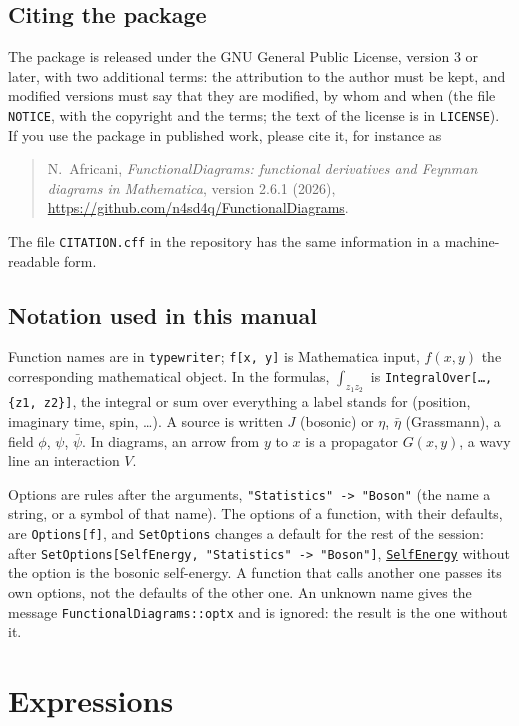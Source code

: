 \documentclass[11pt,a4paper]{article}
\newcommand{\pkg}[1]{\texttt{#1}}
\newcommand{\fnref}[1]{\hyperref[fn:#1]{\pkg{#1}}}
\begin{document}
\subsection{Citing the package}\label{sec:citing}

The package is released under the GNU General Public License, version 3 or later, with two additional terms: the
attribution to the author must be kept, and modified versions must say that they are modified, by whom and when (the
file \pkg{NOTICE}, with the copyright and the terms; the text of the license is in \pkg{LICENSE}). If you use the package
in published work, please cite it, for instance as
\begin{quote}
N.~Africani, \emph{FunctionalDiagrams: functional derivatives and Feynman diagrams in Mathematica}, version 2.6.1 (2026),
\url{https://github.com/n4sd4q/FunctionalDiagrams}.
\end{quote}
The file \pkg{CITATION.cff} in the repository has the same information in a machine-readable form.

\subsection{Notation used in this manual}\label{sec:notation}

Function names are in \pkg{typewriter}; \pkg{f[x, y]} is Mathematica input, $f(x,y)$ the corresponding mathematical
object. In the formulas, $\int_{z_1z_2}$ is \pkg{IntegralOver[\dots, \{z1, z2\}]}, the integral or sum over everything a
label stands for (position, imaginary time, spin, \dots). A source is written $J$ (bosonic) or $\eta$, $\bar\eta$
(Grassmann), a field $\phi$, $\psi$, $\bar\psi$. In diagrams, an arrow from $y$ to $x$ is a propagator $G(x,y)$, a wavy
line an interaction $V$.

Options are rules after the arguments, \pkg{"Statistics" -> "Boson"} (the name a string, or a symbol of that name). The
options of a function, with their defaults, are \pkg{Options[f]}, and \pkg{SetOptions} changes a default for the rest of
the session: after \pkg{SetOptions[SelfEnergy, "Statistics" -> "Boson"]}, \fnref{SelfEnergy} without the option is the
bosonic self-energy. A function that calls another one passes its own options, not the defaults of the other one. An
unknown name gives the message \pkg{FunctionalDiagrams::optx} and is ignored: the result is the one without it.

\section{Expressions}\label{sec:expressions}
\end{document}
